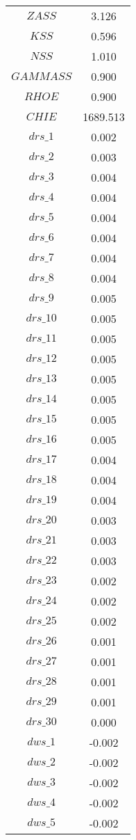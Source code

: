 \begin{center}
\begin{longtable}{cc}
$ZASS$ 	 & 	 3.126 \\
$KSS$ 	 & 	 0.596 \\
$NSS$ 	 & 	 1.010 \\
$GAMMASS$ 	 & 	 0.900 \\
$RHOE$ 	 & 	 0.900 \\
$CHIE$ 	 & 	 1689.513 \\
$drs\_1$ 	 & 	 0.002 \\
$drs\_2$ 	 & 	 0.003 \\
$drs\_3$ 	 & 	 0.004 \\
$drs\_4$ 	 & 	 0.004 \\
$drs\_5$ 	 & 	 0.004 \\
$drs\_6$ 	 & 	 0.004 \\
$drs\_7$ 	 & 	 0.004 \\
$drs\_8$ 	 & 	 0.004 \\
$drs\_9$ 	 & 	 0.005 \\
$drs\_10$ 	 & 	 0.005 \\
$drs\_11$ 	 & 	 0.005 \\
$drs\_12$ 	 & 	 0.005 \\
$drs\_13$ 	 & 	 0.005 \\
$drs\_14$ 	 & 	 0.005 \\
$drs\_15$ 	 & 	 0.005 \\
$drs\_16$ 	 & 	 0.005 \\
$drs\_17$ 	 & 	 0.004 \\
$drs\_18$ 	 & 	 0.004 \\
$drs\_19$ 	 & 	 0.004 \\
$drs\_20$ 	 & 	 0.003 \\
$drs\_21$ 	 & 	 0.003 \\
$drs\_22$ 	 & 	 0.003 \\
$drs\_23$ 	 & 	 0.002 \\
$drs\_24$ 	 & 	 0.002 \\
$drs\_25$ 	 & 	 0.002 \\
$drs\_26$ 	 & 	 0.001 \\
$drs\_27$ 	 & 	 0.001 \\
$drs\_28$ 	 & 	 0.001 \\
$drs\_29$ 	 & 	 0.001 \\
$drs\_30$ 	 & 	 0.000 \\
$dws\_1$ 	 & 	 -0.002 \\
$dws\_2$ 	 & 	 -0.002 \\
$dws\_3$ 	 & 	 -0.002 \\
$dws\_4$ 	 & 	 -0.002 \\
$dws\_5$ 	 & 	 -0.002 \\

\end{longtable}
\end{center}
